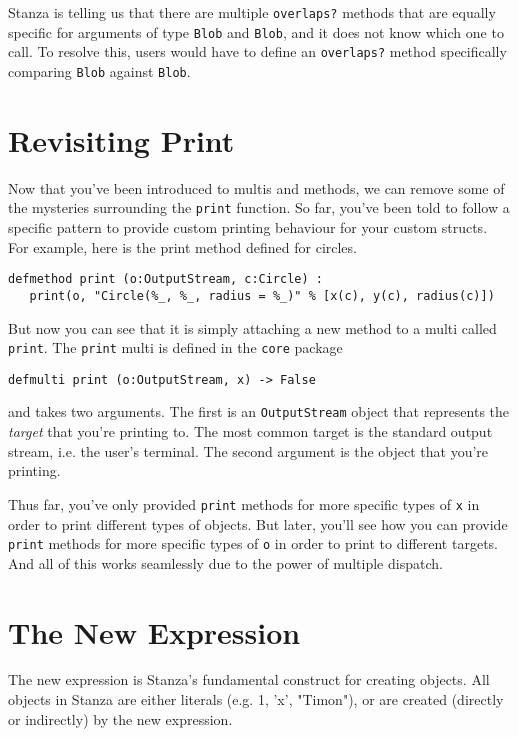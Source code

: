 \documentclass[10pt,oneside]{book}
\begin{document}
Stanza is telling us that there are multiple \texttt{\frenchspacing overlaps?} methods that are equally specific for arguments of type \texttt{\frenchspacing Blob} and \texttt{\frenchspacing Blob}, and it does not know which one to call. To resolve this, users would have to define an \texttt{\frenchspacing overlaps?} method specifically comparing \texttt{\frenchspacing Blob} against \texttt{\frenchspacing Blob}.

\section{Revisiting Print}

Now that you've been introduced to multis and methods, we can remove some of the mysteries surrounding the \texttt{\frenchspacing print} function. So far, you've been told to follow a specific pattern to provide custom printing behaviour for your custom structs. For example, here is the print method defined for circles.
\begin{lstlisting}
defmethod print (o:OutputStream, c:Circle) :
   print(o, "Circle(%_, %_, radius = %_)" % [x(c), y(c), radius(c)])
\end{lstlisting}

But now you can see that it is simply attaching a new method to a multi called \texttt{\frenchspacing print}. The \texttt{\frenchspacing print} multi is defined in the \texttt{\frenchspacing core} package
\begin{lstlisting}
defmulti print (o:OutputStream, x) -> False
\end{lstlisting}
and takes two arguments. The first is an \texttt{\frenchspacing OutputStream} object that represents the {\em target} that you're printing to. The most common target is the standard output stream, i.e. the user's terminal. The second argument is the object that you're printing. 

Thus far, you've only provided \texttt{\frenchspacing print} methods for more specific types of \texttt{\frenchspacing x} in order to print different types of objects. But later, you'll see how you can provide \texttt{\frenchspacing print} methods for more specific types of \texttt{\frenchspacing o} in order to print to different targets. And all of this works seamlessly due to the power of multiple dispatch.

\section{The New Expression}
The new expression is Stanza's fundamental construct for creating objects. All objects in Stanza are either literals (e.g. 1, 'x', "Timon"), or are created (directly or indirectly) by the new expression. 
\end{document}
